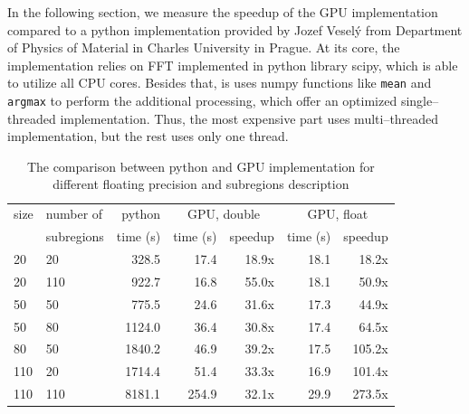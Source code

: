 In the following section, we measure the speedup of the GPU implementation compared to a python implementation provided by Jozef Veselý from Department of Physics of Material in Charles University in Prague. At its core, the implementation relies on FFT implemented in python library scipy, which is able to utilize all CPU cores. Besides that, is uses numpy functions like \texttt{mean} and \texttt{argmax} to perform the additional processing, which offer an optimized single--threaded implementation. Thus, the most expensive part uses multi--threaded implementation, but the rest uses only one thread.





\begin{table}[]
	\centering
	\begin{tabular}{@{}ll|r|rr|rr@{}}
		size & number of  &                        python & \multicolumn{2}{c|}{GPU, double} & \multicolumn{2}{c}{GPU, float} \\
		     & subregions & \multicolumn{1}{c|}{time (s)} & time (s) &               speedup & time (s) &             speedup \\ \midrule
		20   & 20         &                         328.5 &     17.4 &                 18.9x &     18.1 &               18.2x \\
		20   & 110        &                         922.7 &     16.8 &                 55.0x &     18.1 &               50.9x \\
		50   & 50         &                         775.5 &     24.6 &                 31.6x &     17.3 &               44.9x \\
		50   & 80         &                        1124.0 &     36.4 &                 30.8x &     17.4 &               64.5x \\
		80   & 50         &                        1840.2 &     46.9 &                 39.2x &     17.5 &              105.2x \\
		110  & 20         &                        1714.4 &     51.4 &                 33.3x &     16.9 &              101.4x \\
		110  & 110        &                        8181.1 &    254.9 &                 32.1x &     29.9 &              273.5x
	\end{tabular}
	\caption{The comparison between python and GPU implementation for different floating precision and subregions description}
	\label{full-size-table}
\end{table}

